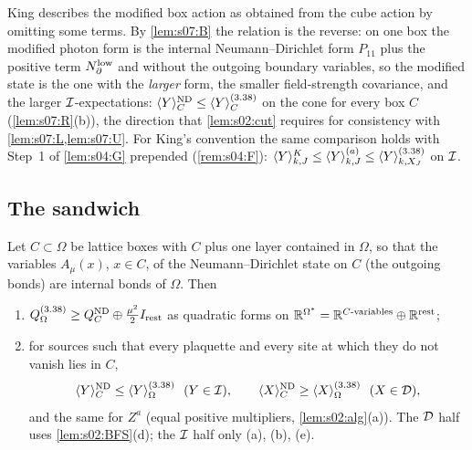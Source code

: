 \begin{remark}\label{rem:s07:K8}
King describes the modified box action as obtained from the cube action by omitting some terms. By \cref{lem:s07:B} the relation is the reverse: on one box the modified photon form is the internal Neumann--Dirichlet form $P_{11}$ plus the positive term $N^{\rm low}_\partial$ and without the outgoing boundary variables, so the modified state is the one with the \emph{larger} form, the smaller field-strength covariance, and the larger $\mathcal I$-expectations: $\langle Y\rangle^{\mathrm{ND}}_{C}\le\langle Y\rangle^{(3.38)}_{C}$ on the cone for every box $C$ (\cref{lem:s07:R}(b)), the direction that \cref{lem:s02:cut} requires for consistency with \cref{lem:s07:L,lem:s07:U}. For King's convention the same comparison holds with Step~1 of \cref{lem:s04:G} prepended (\cref{rem:s04:F}): $\langle Y\rangle^{K}_{k,J}\le\langle Y\rangle^{(a)}_{k,J}\le\langle Y\rangle^{(3.38)}_{k,X_J}$ on $\mathcal I$.
\end{remark}

\subsection{The sandwich}

\begin{lemma}\label{lem:s07:L}
Let $C\subset\Omega$ be lattice boxes with $C$ plus one layer contained in $\Omega$, so that the variables $A_\mu(x)$, $x\in C$, of the Neumann--Dirichlet state on $C$ (the outgoing bonds) are internal bonds of $\Omega$. Then
\begin{enumerate}[label=\textup{(\alph*)},nosep]
\item $Q^{(3.38)}_\Omega\ge Q^{\mathrm{ND}}_C\oplus\frac{\mu^2}2I_{\rm rest}$ as quadratic forms on $\mathbb R^{\Omega^*}=\mathbb R^{C\text{-variables}}\oplus\mathbb R^{\rm rest}$;
\item for sources such that every plaquette and every site at which they do not vanish lies in $C$,
\[
\langle Y\rangle^{\ND}_C\le\langle Y\rangle^{(3.38)}_\Omega\ \ (Y\in\cI),\qquad\langle X\rangle^{\ND}_C\ge\langle X\rangle^{(3.38)}_\Omega\ \ (X\in\cD),
\]
and the same for $Z^a$ (equal positive multipliers, \cref{lem:s02:alg}(a)). The $\mathcal D$ half uses \cref{lem:s02:BFS}(d); the $\mathcal I$ half only (a), (b), (e).
\end{enumerate}
\end{lemma}

